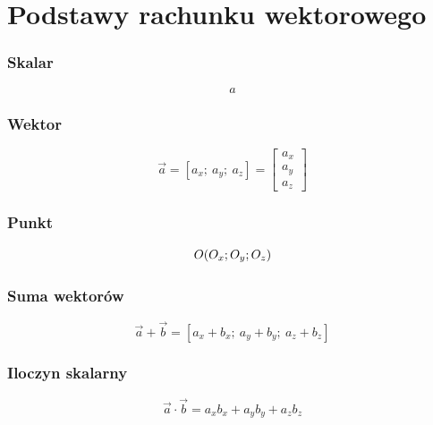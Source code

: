 \section*{Podstawy rachunku wektorowego}

\subsubsection*{Skalar}

\begin{equation}
    a
\end{equation}

\subsubsection*{Wektor}

\begin{equation}
    \Vec{a} = [ a_x;\ a_y;\ a_z ] = \begin{bmatrix} a_x \\ a_y \\ a_z \end{bmatrix}
\end{equation}

\subsubsection*{Punkt}

\begin{equation}
    O( O_x;\\ O_y;\\ O_z )
\end{equation}

\subsubsection*{Suma wektorów}

\begin{equation}
    \Vec{a} + \Vec{b} = [ a_x + b_x;\ a_y + b_y;\ a_z + b_z ]
\end{equation}

\subsubsection*{Iloczyn skalarny}

\begin{equation}
    \Vec{a} \cdot \Vec{b} = a_x b_x + a_y b_y + a_z b_z
\end{equation}

